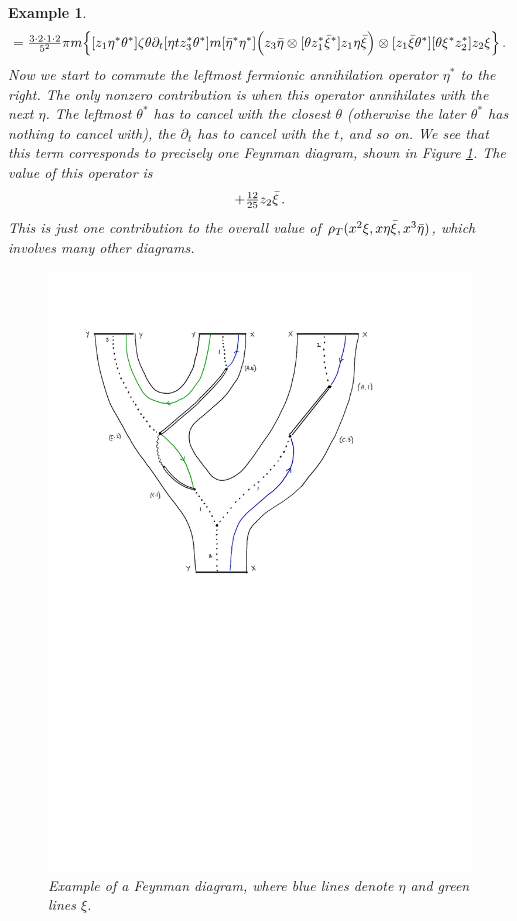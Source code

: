 \documentclass[english,letter paper,12pt,leqno]{article}
\theoremstyle{example}
\newtheorem{example}[theorem]{Example}
\numberwithin{equation}{section}
\begin{document}
\begin{example}
\begin{gather*}
= \tfrac{3 \cdot 2 \cdot 1 \cdot 2}{5^2} \pi m\Big\{ [ z_1 \eta^* \theta^* ] \zeta \theta \partial_t [ \eta t z_3^* \theta^* ] m [\Bar{\eta}^* \eta^*] \Big( z_3 \Bar{\eta} \otimes [ \theta z_1^* \Bar{\xi}^*] z_1 \eta \Bar{\xi}\Big) \otimes [z_1 \Bar{\xi} \theta^*] [\theta \xi^* z_2^*] z_2 \xi \Big\}\,.
\end{gather*}
Now we start to commute the leftmost fermionic annihilation operator $\eta^*$ to the right. The only nonzero contribution is when this operator annihilates with the next $\eta$. The leftmost $\theta^*$ has to cancel with the closest $\theta$ (otherwise the later $\theta^*$ has nothing to cancel with), the $\partial_t$ has to cancel with the $t$, and so on. We see that this term corresponds to precisely one Feynman diagram, shown in Figure \ref{fig:feynman_1}. The value of this operator is
\[
+ \tfrac{12}{25} z_2 \Bar{\xi}\,.
\]
This is just one contribution to the overall value of $\rho_T( x^2 \xi, x \eta \Bar{\xi}, x^3 \Bar{\eta} )$, which involves many other diagrams. %

\begin{figure}
\begin{center}
\includegraphics[scale=1.0]{dia16}
\end{center}
\centering
\caption{Example of a Feynman diagram, where blue lines denote $\eta$ and green lines $\xi$.}\label{fig:feynman_1}
\end{figure}
\end{example}
\end{document}
